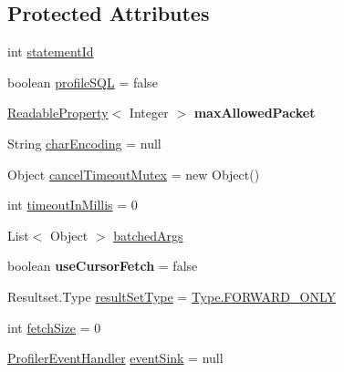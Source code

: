 \subsection*{Protected Attributes}
\begin{DoxyCompactItemize}
\item 
int \mbox{\hyperlink{classcom_1_1mysql_1_1cj_1_1_abstract_query_a1a1a548cf42ced27b8acbba291cb6824}{statement\+Id}}
\item 
boolean \mbox{\hyperlink{classcom_1_1mysql_1_1cj_1_1_abstract_query_a424a97f20af494a51e131f6512d24c05}{profile\+S\+QL}} = false
\item 
\mbox{\label{classcom_1_1mysql_1_1cj_1_1_abstract_query_ae00214b2edf31e71902312a9b670fb8c}} 
\mbox{\hyperlink{interfacecom_1_1mysql_1_1cj_1_1conf_1_1_readable_property}{Readable\+Property}}$<$ Integer $>$ {\bfseries max\+Allowed\+Packet}
\item 
String \mbox{\hyperlink{classcom_1_1mysql_1_1cj_1_1_abstract_query_a8e5db804cd1879f5250c1ee854d819c8}{char\+Encoding}} = null
\item 
Object \mbox{\hyperlink{classcom_1_1mysql_1_1cj_1_1_abstract_query_a8d79e7b4fdf7ff40755b88ccfc4b9cbd}{cancel\+Timeout\+Mutex}} = new Object()
\item 
int \mbox{\hyperlink{classcom_1_1mysql_1_1cj_1_1_abstract_query_ad17e5fb0c9a8a7c413116831638c8651}{timeout\+In\+Millis}} = 0
\item 
List$<$ Object $>$ \mbox{\hyperlink{classcom_1_1mysql_1_1cj_1_1_abstract_query_afe296cec9d344624f3880e21cf450cc0}{batched\+Args}}
\item 
\mbox{\label{classcom_1_1mysql_1_1cj_1_1_abstract_query_a0e9d56291ce3045b9ab52eef735f13cf}} 
boolean {\bfseries use\+Cursor\+Fetch} = false
\item 
Resultset.\+Type \mbox{\hyperlink{classcom_1_1mysql_1_1cj_1_1_abstract_query_a221d45e7acb58be1e2ec467a90df6a20}{result\+Set\+Type}} = \mbox{\hyperlink{enumcom_1_1mysql_1_1cj_1_1protocol_1_1_resultset_1_1_type_ad7cddf3eb759b3961780262b09b0217b}{Type.\+F\+O\+R\+W\+A\+R\+D\+\_\+\+O\+N\+LY}}
\item 
int \mbox{\hyperlink{classcom_1_1mysql_1_1cj_1_1_abstract_query_ab5542f44a4ae49ed220f44aa4baae03f}{fetch\+Size}} = 0
\item 
\mbox{\hyperlink{interfacecom_1_1mysql_1_1cj_1_1log_1_1_profiler_event_handler}{Profiler\+Event\+Handler}} \mbox{\hyperlink{classcom_1_1mysql_1_1cj_1_1_abstract_query_ab150ac7bec3ab4662187594132c91fc0}{event\+Sink}} = null

\end{DoxyCompactItemize}
